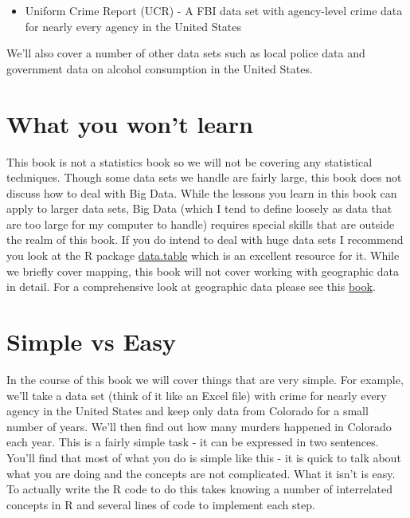 \documentclass[
  12pt,
  openany]{book}
\providecommand{\tightlist}{%
  \setlength{\itemsep}{0pt}\setlength{\parskip}{0pt}}
\begin{document}
\begin{itemize}
\tightlist
\item
  Uniform Crime Report (UCR) - A FBI data set with agency-level crime data for nearly every agency in the United States
\end{itemize}

We'll also cover a number of other data sets such as local police data and government data on alcohol consumption in the United States.

\hypertarget{what-you-wont-learn}{%
\section{What you won't learn}\label{what-you-wont-learn}}

This book is not a statistics book so we will not be covering any statistical techniques. Though some data sets we handle are fairly large, this book does not discuss how to deal with Big Data. While the lessons you learn in this book can apply to larger data sets, Big Data (which I tend to define loosely as data that are too large for my computer to handle) requires special skills that are outside the realm of this book. If you do intend to deal with huge data sets I recommend you look at the R package \href{https://github.com/Rdatatable/data.table/wiki}{data.table} which is an excellent resource for it. While we briefly cover mapping, this book will not cover working with geographic data in detail. For a comprehensive look at geographic data please see this \href{https://geocompr.robinlovelace.net/}{book}.

\hypertarget{simple-vs-easy}{%
\section{Simple vs Easy}\label{simple-vs-easy}}

In the course of this book we will cover things that are very simple. For example, we'll take a data set (think of it like an Excel file) with crime for nearly every agency in the United States and keep only data from Colorado for a small number of years. We'll then find out how many murders happened in Colorado each year. This is a fairly simple task - it can be expressed in two sentences. You'll find that most of what you do is simple like this - it is quick to talk about what you are doing and the concepts are not complicated. What it isn't is easy. To actually write the R code to do this takes knowing a number of interrelated concepts in R and several lines of code to implement each step.
\end{document}
